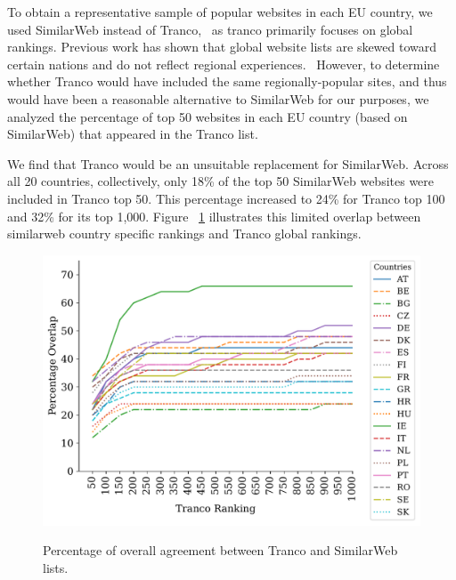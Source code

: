 To obtain a representative sample of popular websites in each EU country, 
we used SimilarWeb instead of Tranco,~\cite{Tranco}
as tranco primarily focuses on global rankings. 
Previous work has shown
that global website lists are skewed toward certain nations and do not reflect regional experiences.~\cite{ruth2022world}
However, to determine whether Tranco would have included 
the same regionally-popular sites, and thus would have been a reasonable alternative to SimilarWeb for our purposes, we analyzed
the percentage of top 50 websites in each EU country (based on SimilarWeb) that appeared in the Tranco list. 

We find that Tranco would be an unsuitable replacement for SimilarWeb.
Across all 20 countries, collectively, only 18\% of the top 50 
SimilarWeb websites were included in Tranco top 50. 
This percentage increased to 24\% for Tranco top 100 and 32\% for its top 1,000.
Figure ~\ref{fig:tranco} illustrates this limited overlap between similarweb country specific rankings and Tranco global rankings. 
\begin{center}
\begin{figure}
    \centering
    \includegraphics[width=\linewidth]{figures/tranco.pdf}\\
    \caption{Percentage of overall agreement between Tranco and SimilarWeb lists.}
\label{fig:tranco}
\vspace{-6mm}
\end{figure}
\end{center}


